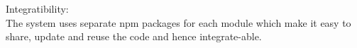 \item {Integratibility:}\\

The system uses separate npm packages for each module which make it easy to share, update and reuse the code and hence integrate-able.  